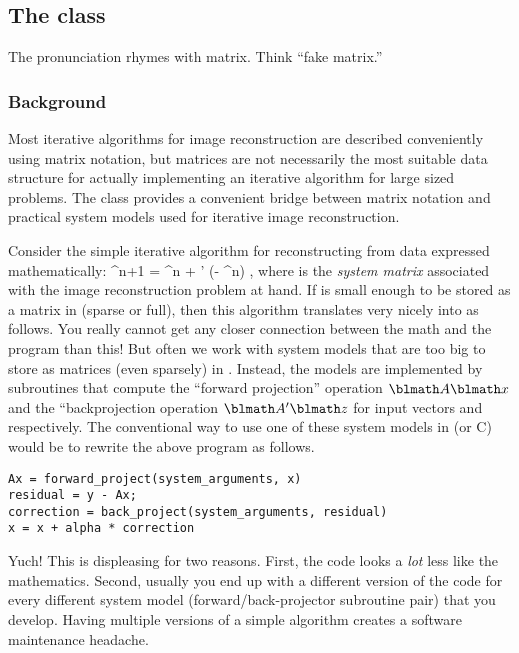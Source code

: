

\subsection{The \fatrixx class}

The pronunciation rhymes with matrix.
Think ``fake matrix.''


\subsubsection{Background}

Most iterative algorithms
for image reconstruction
are described conveniently using matrix notation,
but matrices are not necessarily
the most suitable data structure
for actually implementing an iterative algorithm
for large sized problems.
The \fatrixx class
provides a convenient bridge
between matrix notation
and practical system models
used for iterative image reconstruction.

Consider the simple iterative algorithm
for reconstructing \x from data \y
expressed mathematically:
\be
\x^{n+1} = \x^n + \alpha \A' (\y - \A\x^n)
,
where \A is the \emph{system matrix}
associated with
the image reconstruction problem at hand.
%
If \A is small enough
to be stored as a matrix in \matlab
(sparse or full),
then this algorithm translates
very nicely into \matlab as follows.
\be
{}
You really cannot get any closer connection
between the math and the program than this!
But often we work
with system models
that are too big to store
as matrices (even sparsely) in \matlab.
Instead,
the models
are implemented by subroutines
that compute the ``forward projection'' operation
$\A \x$
and the ``backprojection operation
$\A' \z$
for input vectors \x and \z respectively.
%
The conventional way
to use one of these system models
in \matlab (or C) would be to rewrite
the above program as follows.
\begin{verbatim}
Ax = forward_project(system_arguments, x)
residual = y - Ax;
correction = back_project(system_arguments, residual)
x = x + alpha * correction
\end{verbatim}
Yuch!
This is displeasing for two reasons.
First,
the code looks a \emph{lot} less like the mathematics.
Second,
usually you end up with a different version of the code
for every different system model
(forward/back-projector subroutine pair)
that you develop.
Having multiple versions
of a simple algorithm
creates a software maintenance headache.

